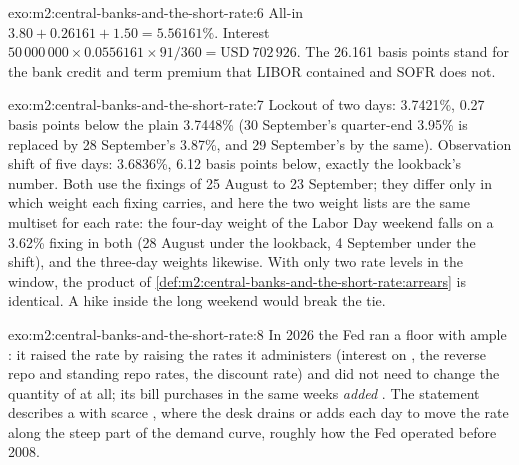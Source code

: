 \begin{solution}{exo:m2:central-banks-and-the-short-rate:6}
All-in $3.80 + 0.26161 + 1.50 = 5.56161\%$. Interest $50\,000\,000 \times
0.0556161 \times 91/360 = \text{USD}~702\,926$. The 26.161 basis points stand
for the bank credit and term premium that LIBOR contained and SOFR does not.
\end{solution}

\begin{solution}{exo:m2:central-banks-and-the-short-rate:7}
Lockout of two days: 3.7421\%, 0.27 basis points below the plain 3.7448\%
(30 September's quarter-end 3.95\% is replaced by 28 September's 3.87\%, and
29 September's by the same). Observation shift of five days: 3.6836\%, 6.12
basis points below, exactly the lookback's number. Both use the fixings of 25
August to 23 September; they differ only in which weight each fixing carries,
and here the two weight lists are the same multiset for each rate: the
four-day weight of the Labor Day weekend falls on a 3.62\% fixing in both
(28 August under the lookback, 4 September under the shift), and the
three-day weights likewise. With only two rate levels in the window, the
product of \cref{def:m2:central-banks-and-the-short-rate:arrears} is
identical. A hike inside the long weekend would break the tie.
\end{solution}

\begin{solution}{exo:m2:central-banks-and-the-short-rate:8}
In 2026 the Fed ran a floor with ample : it raised the rate by
raising the rates it administers (interest on , the reverse repo and
standing repo rates, the discount rate) and did not need to change the
quantity of  at all; its bill purchases in the same weeks
\emph{added} . The statement describes a  with scarce
, where the desk drains or adds  each day to move the rate
along the steep part of the demand curve, roughly how the Fed operated before
2008.
\end{solution}

